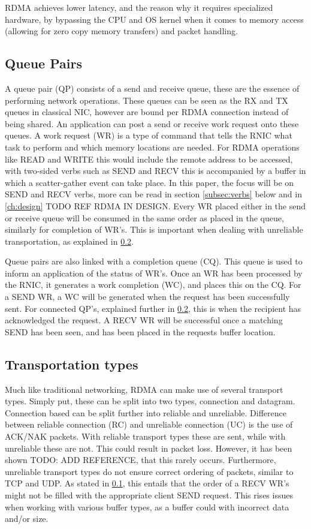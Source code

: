 RDMA achieves lower latency, and the reason why it requires specialized hardware, by bypassing the CPU and OS kernel when it comes to memory access (allowing for zero copy memory transfers) and packet handling.

\subsection{Queue Pairs}\label{subsec:queue-pairs}
A queue pair (QP) consists of a send and receive queue, these are the essence of performing network operations.
These queues can be seen as the RX and TX queues in classical NIC, however are bound per RDMA connection instead of being shared.
An application can post a send or receive work request onto these queues.
A work request (WR) is a type of command that tells the RNIC what task to perform and which memory locations are needed.
For RDMA operations like READ and WRITE this would include the remote address to be accessed, with two-sided verbs such as SEND and RECV this is accompanied by a buffer in which a scatter-gather event can take place.
In this paper, the focus will be on SEND and RECV verbs, more can be read in section \ref{subsec:verbs} below and in \ref{ch:design} TODO REF RDMA IN DESIGN.
Every WR placed either in the send or receive queue will be consumed in the same order as placed in the queue, similarly for completion of WR's.
This is important when dealing with unreliable transportation, as explained in \ref{subsec:transportation-types}.

Queue pairs are also linked with a completion queue (CQ).
This queue is used to inform an application of the status of WR's.
Once an WR has been processed by the RNIC, it generates a work completion (WC), and places this on the CQ.
For a SEND WR, a WC will be generated when the request has been successfully sent.
For connected QP's, explained further in \ref{subsec:transportation-types}, this is when the recipient has acknowledged the request.
A RECV WR will be successful once a matching SEND has been seen, and has been placed in the requests buffer location.

\subsection{Transportation types}\label{subsec:transportation-types}
Much like traditional networking, RDMA can make use of several transport types.
Simply put, these can be split into two types, connection and datagram.
Connection based can be split further into reliable and unreliable.
Difference between reliable connection (RC) and unreliable connection (UC) is the use of ACK/NAK packets.
With reliable transport types these are sent, while with unreliable these are not.
This could result in packet loss.
However, it has been shown TODO: ADD REFERENCE, that this rarely occurs.
Furthermore, unreliable transport types do not ensure correct ordering of packets, similar to TCP and UDP.
As stated in \ref{subsec:queue-pairs}, this entails that the order of a RECV WR's might not be filled with the appropriate client SEND request.
This rises issues when working with various buffer types, as a buffer could with incorrect data and/or size.

